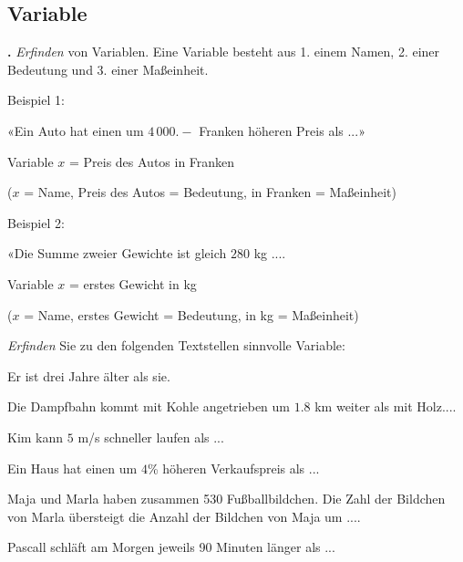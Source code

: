 \platzFuerBerechnungenBisEndeSeite{}
\newpage

\subsection{Variable}
\textbf{\bbwAufgabenNummer{}.}
\textit{Erfinden} von Variablen. Eine Variable besteht aus 1. einem
Namen, 2. einer Bedeutung und 3. einer Maßeinheit.

Beispiel 1:

«Ein Auto hat einen um $4\,000.-$ Franken höheren Preis als ...»

Variable $x$ = Preis des Autos in Franken

($x$ = Name, Preis des Autos = Bedeutung, in Franken = Maßeinheit)

Beispiel 2:

«Die Summe zweier Gewichte ist gleich $280$ kg ....

Variable $x$ = erstes Gewicht in kg

($x$ = Name, erstes Gewicht = Bedeutung, in kg = Maßeinheit)


\textit{Erfinden} Sie zu den folgenden Textstellen sinnvolle Variable:

\begin{bbwAufgabenBlock}


\item Er ist drei Jahre älter als sie.


\item Die Dampfbahn kommt mit Kohle angetrieben um $1.8$ km weiter als mit
Holz....


\item Kim kann $5$ m/s schneller laufen als ...


\item Ein Haus hat einen um $4$\% höheren Verkaufspreis als ...


\noTRAINER{\newpage}

\item Maja und Marla haben zusammen 530 Fußballbildchen. Die Zahl der
Bildchen von Marla übersteigt die Anzahl der Bildchen von Maja um ....


\item Pascall schläft am Morgen jeweils 90 Minuten länger als ...


\end{bbwAufgabenBlock}

